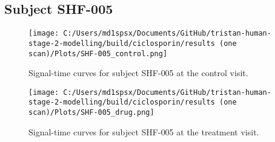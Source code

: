 \documentclass{epflreport}%
\begin{document}
\subsection{Subject SHF{-}005}%
\label{subsec:SubjectSHF{-}005}%

%


\begin{figure}[h!]%
\centering%
\texttt{[image: C:/Users/md1spsx/Documents/GitHub/tristan-human-stage-2-modelling/build/ciclosporin/results (one scan)/Plots/SHF-005\_control.png]}%
\caption{Signal{-}time curves for subject SHF{-}005 at the control visit.}%
\end{figure}

%


\begin{figure}[h!]%
\centering%
\texttt{[image: C:/Users/md1spsx/Documents/GitHub/tristan-human-stage-2-modelling/build/ciclosporin/results (one scan)/Plots/SHF-005\_drug.png]}%
\caption{Signal{-}time curves for subject SHF{-}005 at the treatment visit.}%
\end{figure}
\end{document}
